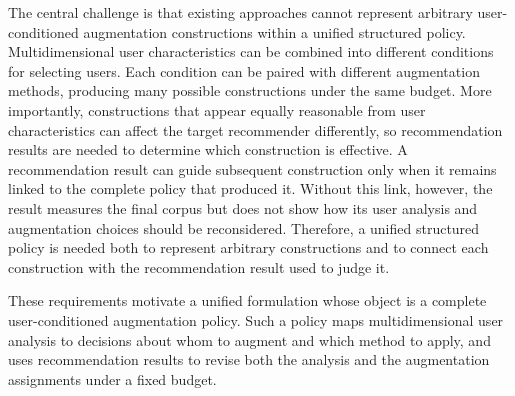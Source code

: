The central challenge is that existing approaches cannot represent arbitrary user-conditioned augmentation constructions within a unified structured policy. Multidimensional user characteristics can be combined into different conditions for selecting users. Each condition can be paired with different augmentation methods, producing many possible constructions under the same budget. More importantly, constructions that appear equally reasonable from user characteristics can affect the target recommender differently, so recommendation results are needed to determine which construction is effective. A recommendation result can guide subsequent construction only when it remains linked to the complete policy that produced it. Without this link, however, the result measures the final corpus but does not show how its user analysis and augmentation choices should be reconsidered. Therefore, a unified structured policy is needed both to represent arbitrary constructions and to connect each construction with the recommendation result used to judge it.

These requirements motivate a unified formulation whose object is a complete user-conditioned augmentation policy. Such a policy maps multidimensional user analysis to decisions about whom to augment and which method to apply, and uses recommendation results to revise both the analysis and the augmentation assignments under a fixed budget.

